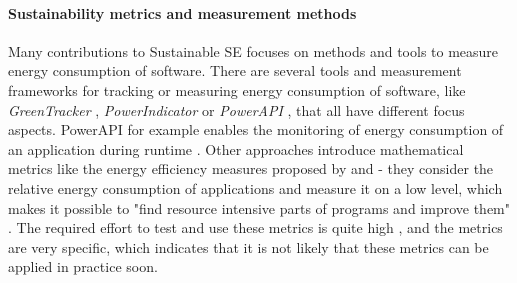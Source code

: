 \documentclass[oribibl]{llncs}
\begin{document}
\paragraph{Sustainability metrics and measurement methods} Many contributions to Sustainable SE focuses on methods and tools to measure energy consumption of software. %
There are several tools and measurement frameworks for tracking or measuring energy consumption of software, like \textit{GreenTracker} \cite{amsel_toward_2011}, \textit{PowerIndicator} \cite{naumann_how_2008} or \textit{PowerAPI} \cite{noureddine_preliminary_2012}, that all have different focus aspects. PowerAPI for example enables the monitoring of energy consumption of an application during runtime \cite{noureddine_preliminary_2012}. %
Other approaches introduce mathematical metrics %
like the energy efficiency measures proposed by \cite{capra_is_2012} and \cite{johann_how_2012} - they consider the relative energy consumption of applications %
and measure it on a low level, which makes it possible to "find resource intensive parts of programs and improve them" \cite[p.\,1]{johann_how_2012}. The required effort to test and use these metrics is quite high \cite{johann_how_2012}, and the metrics are very specific, which indicates that it is not likely that these metrics can be applied in practice soon.\\
\end{document}
